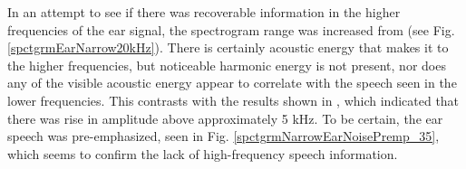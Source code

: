 
In an attempt to see if there was recoverable information in the higher frequencies of the ear signal, the spectrogram range was increased from \DIFdelbegin {}\DIFdelend \DIFaddbegin {}\DIFaddend (see Fig. \ref{spctgrmEarNarrow20kHz}). There is certainly acoustic energy that makes it to the higher frequencies, but noticeable harmonic energy is not present, nor does any of the visible acoustic energy appear to correlate with the speech seen in the lower frequencies.  This contrasts with the results shown in \cite{hansen:97b}, which indicated that there was \DIFdelbegin {}\DIFdelend \DIFaddbegin {}\DIFaddend rise in amplitude above approximately 5 kHz.
To be certain, the ear speech was pre-emphasized, seen in Fig. \ref{spctgrmNarrowEarNoisePremp_35}, which seems to confirm the lack of high-frequency speech information. 
